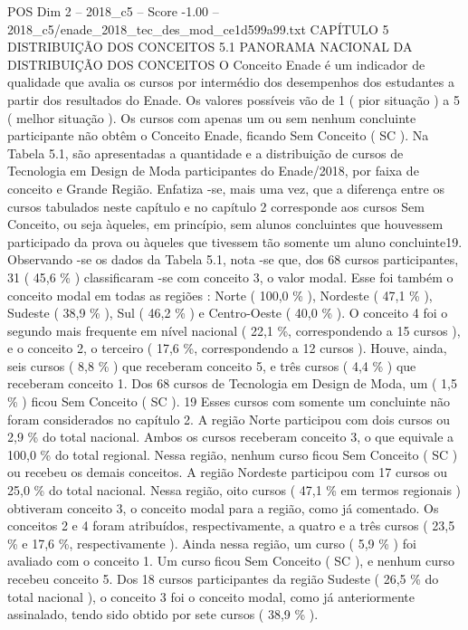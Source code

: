 \begin{textsample}{POS Dim 2 – 2018\_c5 – Score -1.00 – 2018\_c5/enade\_2018\_tec\_des\_mod\_ce1d599a99.txt}  \label{ex:f2_pos_321}
CAPÍTULO 5 DISTRIBUIÇÃO DOS CONCEITOS 5.1 PANORAMA NACIONAL DA DISTRIBUIÇÃO DOS CONCEITOS O Conceito Enade é um indicador de qualidade que avalia os cursos por intermédio dos desempenhos dos estudantes a partir dos resultados do Enade.
Os valores possíveis vão de 1 ( pior situação ) a 5 ( melhor situação ).
Os cursos com apenas um ou sem nenhum concluinte participante não obtêm o Conceito Enade, ficando Sem Conceito ( SC ).
Na Tabela 5.1, são apresentadas a quantidade e a distribuição de cursos de Tecnologia em Design de Moda participantes do Enade/2018, por faixa de conceito e Grande Região.
Enfatiza -se, mais uma vez, que a diferença entre os cursos tabulados neste capítulo e no capítulo 2 corresponde aos cursos Sem Conceito, ou seja àqueles, em princípio, sem alunos concluintes que houvessem participado da prova ou àqueles que tivessem tão somente um aluno concluinte19.
Observando -se os dados da Tabela 5.1, nota -se que, dos 68 cursos participantes, 31 ( 45,6 \% ) classificaram -se com conceito 3, o valor modal.
Esse foi também o conceito modal em todas as regiões : Norte ( 100,0 \% ), Nordeste ( 47,1 \% ), Sudeste ( 38,9 \% ), Sul ( 46,2 \% ) e Centro-Oeste ( 40,0 \% ).
O conceito 4 foi o segundo mais frequente em nível nacional ( 22,1 \%, correspondendo a 15 cursos ), e o conceito 2, o terceiro ( 17,6 \%, correspondendo a 12 cursos ).
Houve, ainda, seis cursos ( 8,8 \% ) que receberam conceito 5, e três cursos ( 4,4 \% ) que receberam conceito 1.
Dos 68 cursos de Tecnologia em Design de Moda, um ( 1,5 \% ) ficou Sem Conceito ( SC ). 19 Esses cursos com somente um concluinte não foram considerados no capítulo 2.
A região Norte participou com dois cursos ou 2,9 \% do total nacional.
Ambos os cursos receberam conceito 3, o que equivale a 100,0 \% do total regional.
Nessa região, nenhum curso ficou Sem Conceito ( SC ) ou recebeu os demais conceitos.
A região Nordeste participou com 17 cursos ou 25,0 \% do total nacional.
Nessa região, oito cursos ( 47,1 \% em termos regionais ) obtiveram conceito 3, o conceito modal para a região, como já comentado.
Os conceitos 2 e 4 foram atribuídos, respectivamente, a quatro e a três cursos ( 23,5 \% e 17,6 \%, respectivamente ).
Ainda nessa região, um curso ( 5,9 \% ) foi avaliado com o conceito 1.
Um curso ficou Sem Conceito ( SC ), e nenhum curso recebeu conceito 5.
Dos 18 cursos participantes da região Sudeste ( 26,5 \% do total nacional ), o conceito 3 foi o conceito modal, como já anteriormente assinalado, tendo sido obtido por sete cursos ( 38,9 \% ).

\end{textsample}
